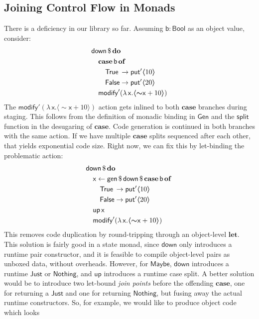 \documentclass[acmsmall,screen,review,anonymous]{acmart}
\newcommand{\mit}[1]{{\mathsf{#1}}}
\newcommand{\msf}[1]{{\mathsf{#1}}}
\newcommand{\mbf}[1]{{\mathbf{#1}}}
\newcommand{\bs}[1]{\boldsymbol{#1}}
\newcommand{\mdo}{\mbf{do}\,}
\newcommand{\ind}{\hspace{1em}}
\newcommand{\lam}{\lambda\,}
\newcommand{\of}{\mbf{of}\,}
\newcommand{\vb}{\mathsf{b}}
\newcommand{\vx}{\mathsf{x}}
\newcommand{\Bool}{\msf{Bool}}
\newcommand{\fro}{\leftarrow}
\newcommand{\case}{\mbf{case\,}}
\newcommand{\spl}{{\bs{\sim}}}
\newcommand{\ql}{{\bs{\langle}}}
\newcommand{\qr}{{\bs{\rangle}}}
\newcommand{\True}{\msf{True}}
\newcommand{\False}{\msf{False}}
\newcommand{\Maybe}{\msf{Maybe}}
\newcommand{\Nothing}{\msf{Nothing}}
\newcommand{\Just}{\msf{Just}}
\theoremstyle{remark}
\newcommand{\mup}{\mit{up}}
\newcommand{\mdown}{\mit{down}}
\newcommand{\Gen}{\msf{Gen}}
\newcommand{\gen}{\mit{gen}}
\newcommand{\qt}[1]{\ql#1\qr}
\newcommand{\dlr}{\,\$\,}
\newcommand{\modify}{\mit{modify}}
\newcommand{\mput}{\mit{put}}
\begin{document}
\subsection{Joining Control Flow in Monads}\label{sec:joining-control-flow-in-monads}

There is a deficiency in our library so far. Assuming $\vb : \Bool$ as an object value, consider:
\begin{alignat*}{3}
  & \mdown \dlr \mdo \\
  & \ind \case \vb\,\of\\
  & \ind \ind \True  \hspace{0.2em}\to \mput' \qt{10}\\
  & \ind \ind \False \to \mput' \qt{20}\\
  & \ind \modify' (\lam \vx. \qt{\spl \vx + 10})
\end{alignat*}
The $\modify' (\lam \vx. \qt{\spl \vx + 10})$ action gets inlined to both $\mbf{case}$
branches during staging. This follows from the definition of monadic binding in
$\Gen$ and the $\mit{split}$ function in the desugaring of $\mbf{case}$. Code
generation is continued in both branches with the same action. If we have
multiple $\mbf{case}$ splits sequenced after each other, that yields exponential
code size. Right now, we can fix this by let-binding the problematic action:
\begin{alignat*}{3}
  & \mdown \dlr \mdo \\
  & \ind \vx \fro \gen \dlr \mdown \dlr \case \vb\,\of\\
  & \ind \ind \True  \hspace{0.2em}\to \mput' \qt{10}\\
  & \ind \ind \False \to \mput' \qt{20}\\
  & \ind \mup\,\vx\\
  & \ind \modify' (\lam \vx. \qt{\spl \vx + 10})
\end{alignat*}
This removes code duplication by round-tripping through an object-level
$\mbf{let}$. This solution is fairly good in a state monad, since $\mdown$ only
introduces a runtime pair constructor, and it is feasible to compile
object-level pairs as unboxed data, without overheads. However, for $\Maybe$,
$\mdown$ introduces a runtime $\Just$ or $\Nothing$, and $\mup$ introduces a
runtime case split. A better solution would be to introduce two let-bound
\emph{join points} before the offending $\mbf{case}$, one for returning a
$\Just$ and one for returning $\Nothing$, but fusing away the actual runtime
constructors. So, for example, we would like to produce object code which looks
\end{document}
